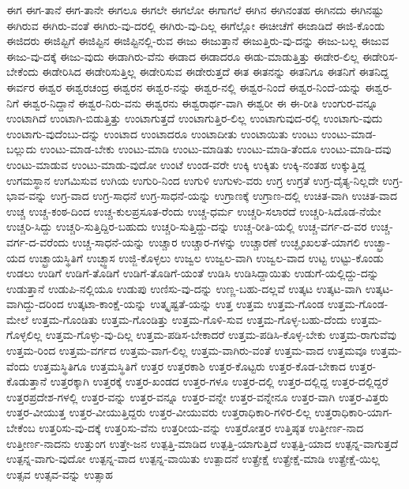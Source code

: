 {ಈಗ
ಈಗ-ತಾನೆ
ಈಗ-ತಾನೇ
ಈಗಲೂ
ಈಗಲೇ
ಈಗಲೋ
ಈಗಾಗಲೆ
ಈಗಿನ
ಈಗಿನಂತಹ
ಈಗಿನದು
ಈಗಿನಷ್ಟು
ಈಗಿರುವ
ಈಗಿರು-ವಂತೆ
ಈಗಿರು-ವು-ದರಲ್ಲಿ
ಈಗಿರು-ವು-ದಿಲ್ಲ
ಈಗೆಲ್ಲೋ
ಈಚೀಚೆಗೆ
ಈಜಾಡಿದೆ
ಈಜಿ-ಕೊಂಡು
ಈಜಿದರು
ಈಜಿಪ್ಟಿಗೆ
ಈಜಿಪ್ಟಿನ
ಈಜಿಪ್ಟಿನಲ್ಲಿ-ರುವ
ಈಜು
ಈಜುತ್ತಾನೆ
ಈಜುತ್ತಿರು-ವು-ದನ್ನು
ಈಜು-ಬಲ್ಲ
ಈಜುವ
ಈಜು-ವು-ದಕ್ಕೆ
ಈಜು-ವುದು
ಈಡಾಗಿರು-ವೆನು
ಈಡಾದ
ಈಡಾದರೂ
ಈಡು-ಮಾಡುತ್ತಿತ್ತು
ಈಡೇರ-ಲಿಲ್ಲ
ಈಡೇರಿಸ-ಬೇಕೆಂದು
ಈಡೇರಿಸಿದ
ಈಡೇರಿಸುತ್ತಿಲ್ಲ
ಈಡೇರಿಸುವ
ಈಡೇರುತ್ತದೆ
ಈತ
ಈತನನ್ನು
ಈತನಿಗೂ
ಈತನಿಗೆ
ಈತನಿದ್ದ
ಈರ್ವರ
ಈಶ್ವರ
ಈಶ್ವರಚಂದ್ರ
ಈಶ್ವರನ
ಈಶ್ವರ-ನನ್ನು
ಈಶ್ವರ-ನಲ್ಲಿ
ಈಶ್ವರ-ನಿಂದೆ
ಈಶ್ವರ-ನಿಂದೆ-ಯನ್ನು
ಈಶ್ವರ-ನಿಗೆ
ಈಶ್ವರ-ನಿದ್ದಾನೆ
ಈಶ್ವರ-ನಿರು-ವನು
ಈಶ್ವರನು
ಈಶ್ವರಾರ್ಥ-ವಾಗಿ
ಈಶ್ವರೀ
ಈ
ಈ-ರೀತಿ
ಉಂಗುರ-ವನ್ನೂ
ಉಂಟಾಗಿದೆ
ಉಂಟಾಗಿ-ಬಿಡುತ್ತಿತ್ತು
ಉಂಟಾಗುತ್ತದೆ
ಉಂಟಾಗುತ್ತಿರ-ಲಿಲ್ಲ
ಉಂಟಾಗುವುದ-ರಲ್ಲಿ
ಉಂಟಾಗು-ವುದು
ಉಂಟಾಗು-ವುದೆಂಬು-ದನ್ನು
ಉಂಟಾದ
ಉಂಟಾದರೂ
ಉಂಟಾದೀತು
ಉಂಟಾಯಿತು
ಉಂಟು
ಉಂಟು-ಮಾಡ-ಬಲ್ಲುದು
ಉಂಟು-ಮಾಡ-ಬೇಕು
ಉಂಟು-ಮಾಡಿ
ಉಂಟು-ಮಾಡಿತು
ಉಂಟು-ಮಾಡಿ-ತೆಂದೂ
ಉಂಟು-ಮಾಡಿ-ದವು
ಉಂಟು-ಮಾಡುವ
ಉಂಟು-ಮಾಡು-ವುದೋ
ಉಂಟೆ
ಉಂಡ-ವರೇ
ಉಕ್ಕಿ
ಉಕ್ಕಿತು
ಉಕ್ಕಿ-ನಂತಹ
ಉಕ್ಕುತ್ತಿದ್ದ
ಉಗಮಸ್ಥಾನ
ಉಗಮಿಸುವ
ಉಗಿಯ
ಉಗುರಿ-ನಿಂದ
ಉಗುಳಿ
ಉಗುಳು-ವರು
ಉಗ್ರ
ಉಗ್ರತೆ
ಉಗ್ರ-ದೈತ್ಯ-ನಿಲ್ಲದೇ
ಉಗ್ರ-ಭಾವ-ವನ್ನು
ಉಗ್ರ-ವಾದ
ಉಗ್ರ-ಸಾಧನೆ
ಉಗ್ರ-ಸಾಧನೆ-ಯನ್ನು
ಉಗ್ರಾಣಕ್ಕೆ
ಉಗ್ರಾಣ-ದಲ್ಲಿ
ಉಚಿತ-ವಾಗಿ
ಉಚಿತ-ವಾದ
ಉಚ್ಚ
ಉಚ್ಚ-ಕಂಠ-ದಿಂದ
ಉಚ್ಚ-ಕುಲಪ್ರಸೂತ-ರೆಂದು
ಉಚ್ಚ-ಧರ್ಮ
ಉಚ್ಚರಿ-ಸಲಾರದೆ
ಉಚ್ಚರಿ-ಸಿದೊಡ-ನೆಯೇ
ಉಚ್ಚರಿ-ಸಿದ್ದು
ಉಚ್ಚರಿ-ಸುತ್ತಿದ್ದಿರ-ಬಹುದು
ಉಚ್ಚರಿ-ಸುತ್ತಿದ್ದು-ದನ್ನು
ಉಚ್ಚ-ರೀತಿ-ಯಲ್ಲಿ
ಉಚ್ಚ-ವರ್ಗ-ದ-ವರ
ಉಚ್ಚ-ವರ್ಗ-ದ-ವರೆಂದು
ಉಚ್ಚ-ಸಾಧನೆ-ಯನ್ನು
ಉಚ್ಚಾರ
ಉಚ್ಚಾರ-ಗಳನ್ನು
ಉಚ್ಚಾರಣೆ
ಉಚ್ಛೃಂಖಲತೆ-ಯಾಗಲಿ
ಉಚ್ಛ್ರಾ-ಯದ
ಉಚ್ಛ್ರಾಯಸ್ಥಿತಿಗೆ
ಉಚ್ಛ್ವಾಸ
ಉಜ್ಜಿ-ಕೊಳ್ಳಲು
ಉಜ್ವಲ
ಉಜ್ವಲ-ವಾಗಿ
ಉಜ್ವಲ-ವಾದ
ಉಟ್ಟ
ಉಟ್ಟು-ಕೊಂಡು
ಉಡಲು
ಉಡಿಗೆ
ಉಡಿಗೆ-ತೊಡಿಗೆ
ಉಡಿಗೆ-ತೊಡಿಗೆ-ಯಂತೆ
ಉಡಿಸಿ
ಉಡಿಸಿದ್ದಾಯಿತು
ಉಡುಗೆ-ಯಲ್ಲಿದ್ದು-ದನ್ನು
ಉಡುತ್ತಾನೆ
ಉಡುಪಿ-ನಲ್ಲಿಯೂ
ಉಡುಪು
ಉಣಿಸು-ವು-ದನ್ನು
ಉಣ್ಣ-ಬಹು-ದಲ್ಲವೆ
ಉತ್ಕಟ
ಉತ್ಕಟ-ವಾಗಿ
ಉತ್ಕಟ-ವಾಗಿದ್ದು-ದರಿಂದ
ಉತ್ಕಟಾ-ಕಾಂಕ್ಷೆ-ಯನ್ನು
ಉತ್ಕೃಷ್ಟತೆ-ಯನ್ನು
ಉತ್ತ
ಉತ್ತಮ
ಉತ್ತಮ-ಗೊಂಡ
ಉತ್ತಮ-ಗೊಂಡ-ಮೇಲೆ
ಉತ್ತಮ-ಗೊಂಡಿತು
ಉತ್ತಮ-ಗೊಂಡಿತ್ತು
ಉತ್ತಮ-ಗೊಳಿ-ಸುವ
ಉತ್ತಮ-ಗೊಳ್ಳ-ಬಹು-ದೆಂದು
ಉತ್ತಮ-ಗೊಳ್ಳಲಿಲ್ಲ
ಉತ್ತಮ-ಗೊಳ್ಳು-ವು-ದಿಲ್ಲ
ಉತ್ತಮ-ಪಡಿಸ-ಬೇಕಾದರೆ
ಉತ್ತಮ-ಪಡಿಸಿ-ಕೊಳ್ಳ-ಬೇಕು
ಉತ್ತಮ-ರಾಗುವೆವು
ಉತ್ತಮ-ರಿಂದ
ಉತ್ತಮ-ವರ್ಗದ
ಉತ್ತಮ-ವಾಗ-ಲಿಲ್ಲ
ಉತ್ತಮ-ವಾಗಿರು-ವಂತೆ
ಉತ್ತಮ-ವಾದ
ಉತ್ತಮವೂ
ಉತ್ತಮ-ವೆಂದು
ಉತ್ತಮಸ್ಥಿತಿಗೂ
ಉತ್ತಮಸ್ಥಿತಿಗೆ
ಉತ್ತರ
ಉತ್ತರಕಾಶಿ
ಉತ್ತರ-ಕೊಟ್ಟರು
ಉತ್ತರ-ಕೊಡ-ಬೇಕಾದ
ಉತ್ತರ-ಕೊಡುತ್ತಾನೆ
ಉತ್ತರಕ್ಕಾಗಿ
ಉತ್ತರಕ್ಕೆ
ಉತ್ತರ-ಖಂಡದ
ಉತ್ತರ-ಗಳೂ
ಉತ್ತರ-ದಲ್ಲಿ
ಉತ್ತರ-ದಲ್ಲಿದ್ದ
ಉತ್ತರ-ದಲ್ಲಿದ್ದರೆ
ಉತ್ತರಪ್ರದೇಶ-ಗಳಲ್ಲಿ
ಉತ್ತರ-ವನ್ನು
ಉತ್ತರ-ವನ್ನೂ
ಉತ್ತರ-ವನ್ನೇ
ಉತ್ತರ-ವನ್ನೇನೂ
ಉತ್ತರ-ವಾಗಿ
ಉತ್ತರ-ವಿತ್ತರು
ಉತ್ತರ-ವೀಯುತ್ತ
ಉತ್ತರ-ವೀಯುತ್ತಿದ್ದರು
ಉತ್ತರ-ವೀಯುವರು
ಉತ್ತರಾಧಿಕಾರಿ-ಗಳಿರ-ಲಿಲ್ಲ
ಉತ್ತರಾಧಿಕಾರಿ-ಯಾಗ-ಬೇಕೆಂಬ
ಉತ್ತರಿಸು-ವು-ದಕ್ಕೆ
ಉತ್ತರಿಸು-ವೆನು
ಉತ್ತರೀಯ-ವನ್ನು
ಉತ್ತರೋತ್ತರ
ಉತ್ತಿಷ್ಠತ
ಉತ್ತೀರ್ಣ-ನಾದ
ಉತ್ತೀರ್ಣ-ನಾದನು
ಉತ್ತುಂಗ
ಉತ್ತೇ-ಜನ
ಉತ್ಪತ್ತಿ-ಮಾಡಿದ
ಉತ್ಪತ್ತಿ-ಯಾಗುತ್ತಿದೆ
ಉತ್ಪತ್ತಿ-ಯಾದ
ಉತ್ಪನ್ನ-ವಾಗುತ್ತದೆ
ಉತ್ಪನ್ನ-ವಾಗು-ವುದೋ
ಉತ್ಪನ್ನ-ವಾದ
ಉತ್ಪನ್ನ-ವಾಯಿತು
ಉತ್ಪಾದನೆ
ಉತ್ಪ್ರೇಕ್ಷೆ
ಉತ್ಪ್ರೇಕ್ಷೆ-ಮಾಡಿ
ಉತ್ಪ್ರೇಕ್ಷೆ-ಯಿಲ್ಲ
ಉತ್ಸವ
ಉತ್ಸವ-ವನ್ನು
ಉತ್ಸಾಹ
}
